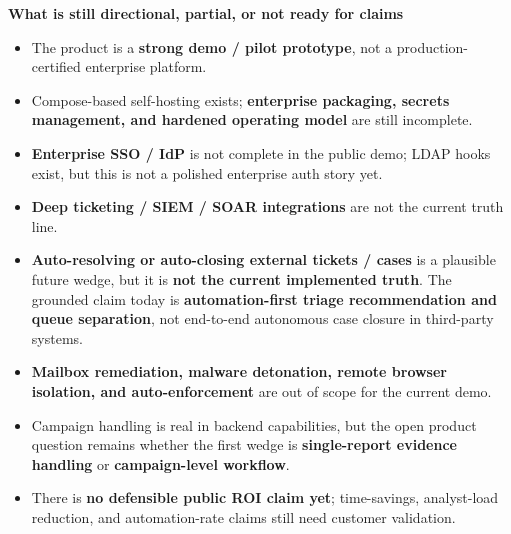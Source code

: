 \documentclass[10pt,a4paper]{article}
\begin{document}
\noindent\textbf{What is still directional, partial, or not ready for claims}
\begin{itemize}
  \item The product is a \textbf{strong demo / pilot prototype}, not a production-certified enterprise platform.
  \item Compose-based self-hosting exists; \textbf{enterprise packaging, secrets management, and hardened operating model} are still incomplete.
  \item \textbf{Enterprise SSO / IdP} is not complete in the public demo; LDAP hooks exist, but this is not a polished enterprise auth story yet.
  \item \textbf{Deep ticketing / SIEM / SOAR integrations} are not the current truth line.
  \item \textbf{Auto-resolving or auto-closing external tickets / cases} is a plausible future wedge, but it is \textbf{not the current implemented truth}. The grounded claim today is \textbf{automation-first triage recommendation and queue separation}, not end-to-end autonomous case closure in third-party systems.
  \item \textbf{Mailbox remediation, malware detonation, remote browser isolation, and auto-enforcement} are out of scope for the current demo.
  \item Campaign handling is real in backend capabilities, but the open product question remains whether the first wedge is \textbf{single-report evidence handling} or \textbf{campaign-level workflow}.
  \item There is \textbf{no defensible public ROI claim yet}; time-savings, analyst-load reduction, and automation-rate claims still need customer validation.
\end{itemize}
\end{document}
